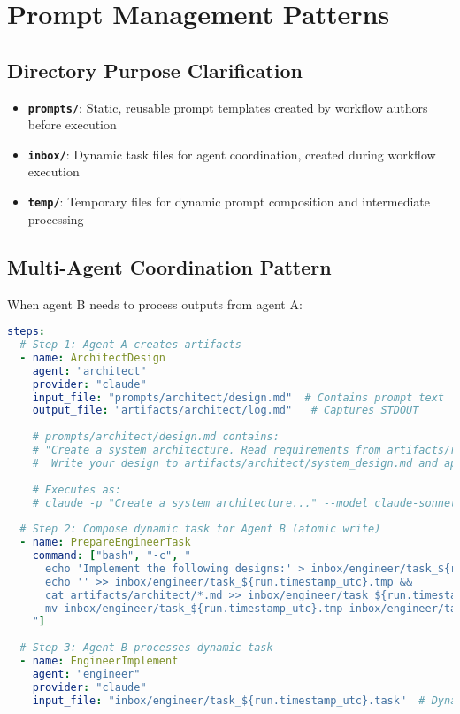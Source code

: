 \documentclass[11pt,a4paper]{article}
\begin{document}
\section{Prompt Management Patterns}

\subsection{Directory Purpose Clarification}

\begin{itemize}
    \item \textbf{\texttt{prompts/}}: Static, reusable prompt templates created by workflow authors before execution
    \item \textbf{\texttt{inbox/}}: Dynamic task files for agent coordination, created during workflow execution
    \item \textbf{\texttt{temp/}}: Temporary files for dynamic prompt composition and intermediate processing
\end{itemize}

\subsection{Multi-Agent Coordination Pattern}

When agent B needs to process outputs from agent A:

\begin{lstlisting}[language=yaml, caption={Multi-Agent Coordination Pattern}]
steps:
  # Step 1: Agent A creates artifacts
  - name: ArchitectDesign
    agent: "architect"
    provider: "claude"
    input_file: "prompts/architect/design.md"  # Contains prompt text
    output_file: "artifacts/architect/log.md"   # Captures STDOUT
    
    # prompts/architect/design.md contains:
    # "Create a system architecture. Read requirements from artifacts/requirements/*.md
    #  Write your design to artifacts/architect/system_design.md and api_spec.md"
    
    # Executes as:
    # claude -p "Create a system architecture..." --model claude-sonnet-4-20250514 > artifacts/architect/log.md
    
  # Step 2: Compose dynamic task for Agent B (atomic write)
  - name: PrepareEngineerTask
    command: ["bash", "-c", "
      echo 'Implement the following designs:' > inbox/engineer/task_${run.timestamp_utc}.tmp &&
      echo '' >> inbox/engineer/task_${run.timestamp_utc}.tmp &&
      cat artifacts/architect/*.md >> inbox/engineer/task_${run.timestamp_utc}.tmp &&
      mv inbox/engineer/task_${run.timestamp_utc}.tmp inbox/engineer/task_${run.timestamp_utc}.task
    "]
    
  # Step 3: Agent B processes dynamic task
  - name: EngineerImplement
    agent: "engineer"
    provider: "claude"
    input_file: "inbox/engineer/task_${run.timestamp_utc}.task"  # Dynamically composed
\end{lstlisting}
\end{document}
